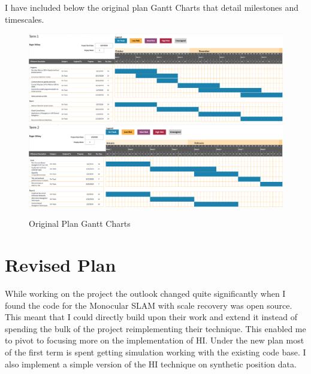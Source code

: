 \documentclass[]{../resources/final_report}
\begin{document}
I have included below the original plan Gantt Charts that detail milestones and timescales.
\\
\begin{figure}[h]
  \centering
  \includegraphics[width=\textwidth]{Term1Ganttv1.png}
  \includegraphics[width=\textwidth]{Term2Ganttv1.png}
  \caption{Original Plan Gantt Charts}
  \label{}
\end{figure}



\section{Revised Plan}

While working on the project the outlook changed quite significantly when I found the code for 
the Monocular SLAM with scale recovery was open source. This meant that I could directly build 
upon their work and extend it instead of spending the bulk of the project reimplementing their 
technique. This enabled me to pivot to focusing more on the implementation of HI. 
Under the new plan most of the first term is spent getting simulation working with the existing 
code base. I also implement a simple version of the HI technique on synthetic 
position data.
\end{document}
